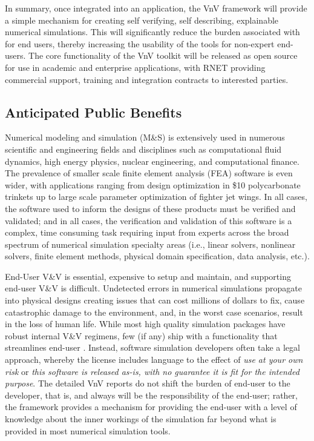 In summary, once integrated into an application, the VnV framework will provide a simple mechanism for creating self verifying, self describing, explainable numerical simulations. This will significantly reduce the burden associated with \VV for end users, thereby increasing the usability of the tools for non-expert end-users. The core functionality of the VnV toolkit will be released as open source for use in academic and enterprise applications, with RNET providing commercial support, training and integration contracts to interested parties.

\subsection{Anticipated Public Benefits}
Numerical modeling and simulation (M\&S) is extensively used in numerous scientific and engineering fields and disciplines such as computational fluid dynamics, high energy physics, nuclear engineering, and computational finance. The prevalence of smaller scale finite element analysis (FEA) software is even wider, with applications ranging from design optimization in \$10 polycarbonate trinkets up to large scale parameter optimization of fighter jet wings. In all cases, the software used to inform the designs of these products must be verified and validated; and in all cases, the verification and validation of this software is a complex, time consuming task requiring input from experts across the broad spectrum of numerical simulation specialty areas (i.e., linear solvers, nonlinear solvers, finite element methods, physical domain specification, data analysis, etc.). 

End-User V\&V is essential, expensive to setup and maintain, and supporting end-user V\&V is difficult. Undetected errors in numerical simulations propagate into physical designs creating issues that can cost millions of dollars to fix, cause catastrophic damage to the environment, and, in the worst case scenarios, result in the loss of human life. While most high quality simulation packages have robust internal V\&V regimens, few (if any) ship with a functionality that streamlines end-user \VV. Instead, software simulation developers often take a legal approach, whereby the license includes language to the effect of \emph{use at your own risk} or \emph{this software is released as-is, with no guarantee it is fit for the intended purpose}. The detailed VnV reports do not shift the burden of end-user \VV to the developer, that is, and always will be the responsibility of the end-user; rather, the framework provides a mechanism for providing the end-user with a level of knowledge about the inner workings of the simulation far beyond what is provided in most numerical simulation tools. 



